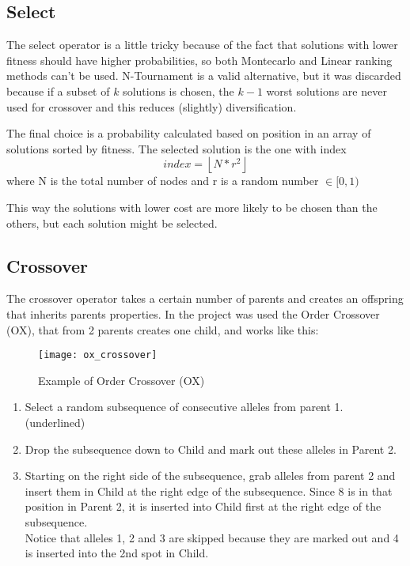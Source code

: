 	\subsection{Select}
		The select operator is a little tricky because of the fact that solutions with lower fitness should have higher probabilities, so both Montecarlo and Linear ranking methods can't be used. N-Tournament is a valid alternative, but it was discarded because if a subset of $k$ solutions is chosen, the $k-1$ worst solutions are never used for crossover and this reduces (slightly) diversification.
		
		The final choice is a probability calculated based on position in an array of solutions sorted by fitness. The selected solution is the one with index
		\[index = \left \lfloor{N * r^{2}}\right \rfloor\]
		where N is the total number of nodes and r is a random number $\in [0, 1)$
		
		This way the solutions with lower cost are more likely to be chosen than the others, but each solution might be selected.
		
	\subsection{Crossover}
		The crossover operator takes a certain number of parents and creates an offspring that inherits parents properties. In the project was used the Order Crossover (OX), that from 2 parents creates one child, and works like this:
		
		\begin{figure}[h]
		\texttt{[image: ox\_crossover]}
		\centering
		\caption{Example of Order Crossover (OX)}
		\end{figure}
		
		\begin{enumerate}
			\item Select a random subsequence of consecutive alleles from parent 1. (underlined)
			\item Drop the subsequence down to Child and mark out these alleles in Parent 2.
			\item Starting on the right side of the subsequence, grab alleles from parent 2 and insert them in Child at the right edge of the subsequence. Since 8 is in that position in Parent 2, it is inserted into Child first at the right edge of the subsequence.\\
				Notice that alleles 1, 2 and 3 are skipped because they are marked out and 4 is inserted into the 2nd spot in Child.
		\end{enumerate}
		

